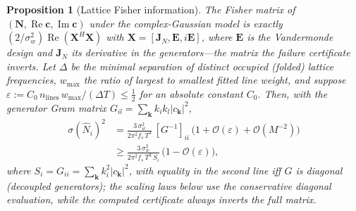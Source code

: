 \documentclass[twocolumn,preprintnumbers,amsmath,amssymb,pra,floatfix]{revtex4-2}
\newcommand{\vect}[1]{\bm{#1}}
\newcommand{\bigO}{\mathcal{O}}
\newtheorem{proposition}{Proposition}
\begin{document}
\begin{proposition}[Lattice Fisher information]
\label{prop:crb}
The Fisher matrix of
$(\vect{N},\operatorname{Re}\vect{c},\operatorname{Im}\vect{c})$
under the complex-Gaussian model is \emph{exactly}
$(2/\sigma_w^{2})\operatorname{Re}(\vect{X}^{H}\vect{X})$ with
$\vect{X}=[\vect{J}_{N},\vect{E},i\vect{E}]$, where $\vect{E}$ is the
Vandermonde design and $\vect{J}_{N}$ its derivative in the
generators---the matrix the failure certificate inverts.  Let
$\Delta$ be the minimal separation of distinct occupied (folded)
lattice frequencies, $w_{\max}$ the ratio of largest to smallest
fitted line weight, and suppose
$\varepsilon:=C_0\,n_{\mathrm{lines}}\,w_{\max}/(\Delta T)\le\tfrac12$
for an absolute constant $C_0$.  Then, with the generator Gram
matrix $G_{il}=\sum_{\vect{k}}k_ik_l|c_{\vect{k}}|^{2}$,
\begin{align}
  \sigma(\hat N_i)^{2}
  &=\frac{3\,\sigma_w^{2}}{2\pi^{2} f_s\,T^{3}}\,
  [G^{-1}]_{ii}\,
  \bigl(1+\bigO(\varepsilon)+\bigO(M^{-2})\bigr)
  \label{eq:crb}\\
  &\ge\frac{3\,\sigma_w^{2}}{2\pi^{2} f_s\,T^{3}\,S_i}\,
  \bigl(1-\bigO(\varepsilon)\bigr),
  \nonumber
\end{align}
where $S_i=G_{ii}=\sum_{\vect{k}}k_i^{2}|c_{\vect{k}}|^{2}$,
with equality in the second line iff $G$ is diagonal (decoupled
generators); the scaling laws below use the conservative diagonal
evaluation, while the computed certificate always inverts the full
matrix.
\end{proposition}
\end{document}
